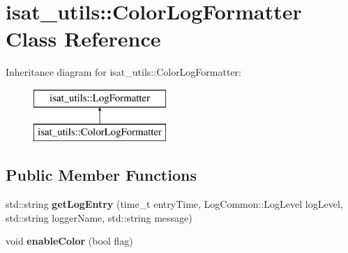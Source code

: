 \hypertarget{classisat__utils_1_1_color_log_formatter}{}\section{isat\+\_\+utils\+:\+:Color\+Log\+Formatter Class Reference}
\label{classisat__utils_1_1_color_log_formatter}
Inheritance diagram for isat\+\_\+utils\+:\+:Color\+Log\+Formatter\+:\begin{figure}[H]
\begin{center}
\leavevmode
\includegraphics[height=2.000000cm]{classisat__utils_1_1_color_log_formatter}
\end{center}
\end{figure}
\subsection*{Public Member Functions}
\begin{DoxyCompactItemize}
\item 
std\+::string {\bfseries get\+Log\+Entry} (time\+\_\+t entry\+Time, Log\+Common\+::\+Log\+Level log\+Level, std\+::string logger\+Name, std\+::string message)\hypertarget{classisat__utils_1_1_color_log_formatter_aad19191600c36d45e035e7431b090f36}{}\label{classisat__utils_1_1_color_log_formatter_aad19191600c36d45e035e7431b090f36}

\item 
void {\bfseries enable\+Color} (bool flag)\hypertarget{classisat__utils_1_1_color_log_formatter_ae2ae478fa1b255d9757e67ad9d90a3af}{}\label{classisat__utils_1_1_color_log_formatter_ae2ae478fa1b255d9757e67ad9d90a3af}

\end{DoxyCompactItemize}
